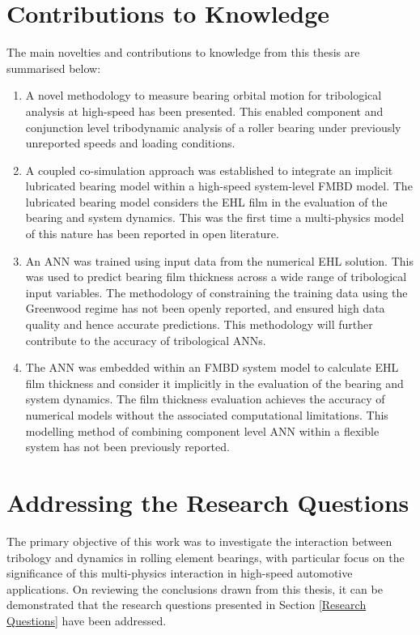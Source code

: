 \section{Contributions to Knowledge} \label{Contribution to Knowledge}

The main novelties and contributions to knowledge from this thesis are summarised below:

\begin{enumerate}
	\item A novel methodology to measure bearing orbital motion for tribological analysis at high-speed has been presented. This enabled component and conjunction level tribodynamic analysis of a roller bearing under previously unreported speeds and loading conditions.
	\item A coupled co-simulation approach was established to integrate an implicit lubricated bearing model within a high-speed system-level FMBD model. The lubricated bearing model considers the EHL film in the evaluation of the bearing and system dynamics. This was the first time a multi-physics model of this nature has been reported in open literature.
	\item An ANN was trained using input data from the numerical EHL solution. This was used to predict bearing film thickness across a wide range of tribological input variables. The methodology of constraining the training data using the Greenwood regime has not been openly reported, and ensured high data quality and hence accurate predictions. This methodology will further contribute to the accuracy of tribological ANNs.
	\item The ANN was embedded within an FMBD system model to calculate EHL film thickness and consider it implicitly in the evaluation of the bearing and system dynamics. The film thickness evaluation achieves the accuracy of numerical models without the associated computational limitations. This modelling method of combining component level ANN within a flexible system has not been previously reported.
\end{enumerate}

\section{Addressing the Research Questions}
The primary objective of this work was to investigate the interaction between tribology and dynamics in rolling element bearings, with particular focus on the significance of this multi-physics interaction in high-speed automotive applications. On reviewing the conclusions drawn from this thesis, it can be demonstrated that the research questions presented in Section \ref{Research Questions} have been addressed.

